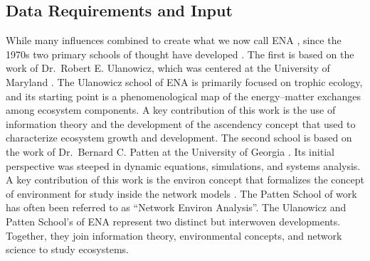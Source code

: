 \documentclass[11pt]{article}
\begin{document}
\begin{spacing}{2}
\subsection{Data Requirements and Input}
While many influences combined to create what we now call ENA
\citep[e.g.,][]{patten59, margalef63, hannon73, pimm82,
  golley1993history}, since the 1970s two primary schools of thought
have developed \citep{scharler09comparing}.  The first is based on the
work of Dr.\ Robert E. Ulanowicz, which was centered at the University
of Maryland \citep{ulanowicz86, ulanowicz97, ulanowicz09_window}.  The
Ulanowicz school of ENA is primarily focused on trophic ecology, and
its starting point is a phenomenological map of the energy--matter
exchanges among ecosystem components.  A key contribution of this work
is the use of information theory and the development of the ascendency
concept that \citet{ulanowicz86, ulanowicz97} used to characterize
ecosystem growth and development.  The second school is based on the
work of Dr.\ Bernard C. Patten at the University of Georgia
\citep{patten76, matis81, patten82, fath99_review}.  Its initial
perspective was steeped in dynamic equations, simulations, and systems
analysis.  A key contribution of this work is the environ concept that
formalizes the concept of environment for study inside the network
models \citep{patten78}.  The Patten School of work has often been
referred to as ``Network Environ Analysis''.  The Ulanowicz and Patten
School's of ENA represent two distinct but interwoven developments.
Together, they join information theory, environmental concepts, and
network science to study ecosystems.



\end{spacing}
\end{document}
